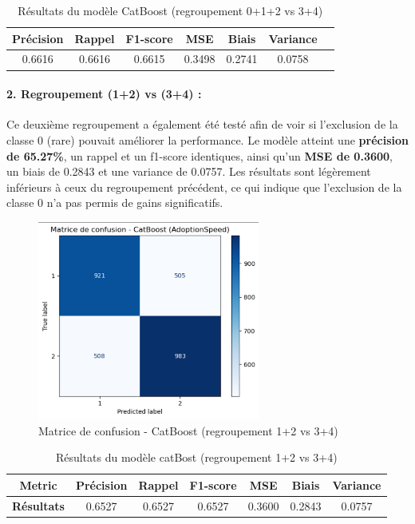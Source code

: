 \documentclass[a4paper,12pt]{article}
\begin{document}
\begin{table}[h]
\centering
\begin{tabular}{|c|c|c|c|c|c|c|}
\hline
\textbf{Précision} & \textbf{Rappel} & \textbf{F1-score} & \textbf{MSE} & \textbf{Biais} & \textbf{Variance} \\
\hline
0.6616 & 0.6616 & 0.6615 & 0.3498 & 0.2741 & 0.0758 \\
\hline
\end{tabular}
\caption{Résultats du modèle CatBoost (regroupement 0+1+2 vs 3+4)}
\end{table}

    

\paragraph{2. Regroupement (1+2) vs (3+4) :}

Ce deuxième regroupement a également été testé afin de voir si l'exclusion de la classe 0 (rare) pouvait améliorer la performance. Le modèle atteint une \textbf{précision de 65.27\%}, un rappel et un f1-score identiques, ainsi qu’un \textbf{MSE de 0.3600}, un biais de 0.2843 et une variance de 0.0757. Les résultats sont légèrement inférieurs à ceux du regroupement précédent, ce qui indique que l'exclusion de la classe 0 n’a pas permis de gains significatifs.

\begin{figure}[H]
    \centering
    \includegraphics[width=0.65\textwidth]{catboost_12_vs_34_confusion.png}
    \caption{Matrice de confusion - CatBoost (regroupement 1+2 vs 3+4)}
    \label{fig:catboost12_conf}
\end{figure}

\begin{table}[ht]
\centering
\begin{tabular}{|c|c|c|c|c|c|c|}
\hline
\textbf{Metric} & \textbf{Précision} & \textbf{Rappel} & \textbf{F1-score} & \textbf{MSE} & \textbf{Biais} & \textbf{Variance} \\ \hline
\textbf{Résultats} & 0.6527 & 0.6527 & 0.6527 & 0.3600 & 0.2843 & 0.0757 \\ \hline
\end{tabular}
\caption{Résultats du modèle catBost (regroupement 1+2 vs 3+4)}
\label{tab:resultats}
\end{table}
\end{document}

